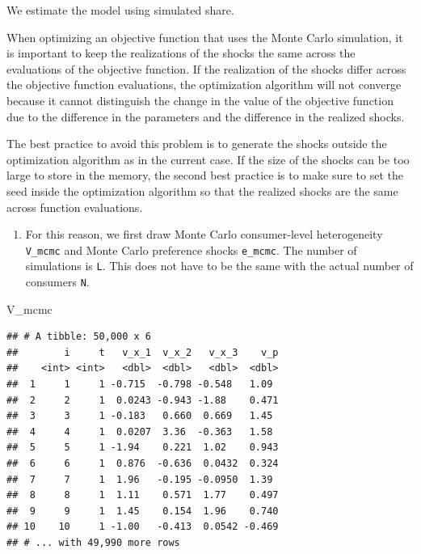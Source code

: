 \documentclass[
]{book}
\newenvironment{Shaded}{\begin{snugshade}}{\end{snugshade}}
\newcommand{\NormalTok}[1]{#1}
\providecommand{\tightlist}{%
  \setlength{\itemsep}{0pt}\setlength{\parskip}{0pt}}
\begin{document}
We estimate the model using simulated share.

When optimizing an objective function that uses the Monte Carlo simulation, it is important to keep the realizations of the shocks the same across the evaluations of the objective function. If the realization of the shocks differ across the objective function evaluations, the optimization algorithm will not converge because it cannot distinguish the change in the value of the objective function due to the difference in the parameters and the difference in the realized shocks.

The best practice to avoid this problem is to generate the shocks outside the optimization algorithm as in the current case. If the size of the shocks can be too large to store in the memory, the second best practice is to make sure to set the seed inside the optimization algorithm so that the realized shocks are the same across function evaluations.

\begin{enumerate}
\def\labelenumi{\arabic{enumi}.}
\setcounter{enumi}{1}
\tightlist
\item
  For this reason, we first draw Monte Carlo consumer-level heterogeneity \texttt{V\_mcmc} and Monte Carlo preference shocks \texttt{e\_mcmc}. The number of simulations is \texttt{L}. This does not have to be the same with the actual number of consumers \texttt{N}.
\end{enumerate}

\begin{Shaded}
\begin{Highlighting}[]
\NormalTok{V\_mcmc}
\end{Highlighting}
\end{Shaded}

\begin{verbatim}
## # A tibble: 50,000 x 6
##        i     t   v_x_1  v_x_2   v_x_3    v_p
##    <int> <int>   <dbl>  <dbl>   <dbl>  <dbl>
##  1     1     1 -0.715  -0.798 -0.548   1.09 
##  2     2     1  0.0243 -0.943 -1.88    0.471
##  3     3     1 -0.183   0.660  0.669   1.45 
##  4     4     1  0.0207  3.36  -0.363   1.58 
##  5     5     1 -1.94    0.221  1.02    0.943
##  6     6     1  0.876  -0.636  0.0432  0.324
##  7     7     1  1.96   -0.195 -0.0950  1.39 
##  8     8     1  1.11    0.571  1.77    0.497
##  9     9     1  1.45    0.154  1.96    0.740
## 10    10     1 -1.00   -0.413  0.0542 -0.469
## # ... with 49,990 more rows
\end{verbatim}
\end{document}
